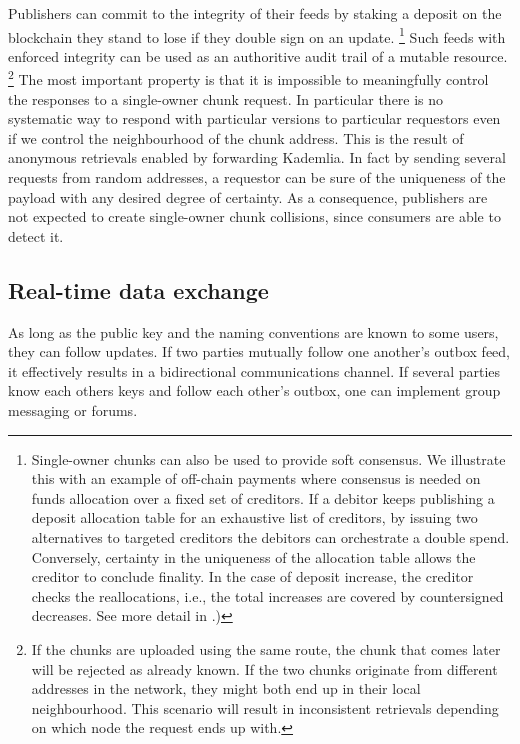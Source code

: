 Publishers can commit to the integrity of their feeds by staking a deposit on the blockchain they stand to lose if they double sign on an update.%
%
\footnote{Single-owner chunks can also be used to provide soft consensus. We illustrate this with an example of off-chain payments where  consensus  is needed on funds allocation over a fixed set of creditors. If a debitor keeps publishing a deposit allocation table for an exhaustive list of creditors, by issuing two alternatives to targeted creditors the debitors can orchestrate a double spend. Conversely, certainty in the uniqueness of the allocation table allows the creditor to conclude finality. In the case of deposit increase, the creditor checks the reallocations, i.e., the total increases are covered by countersigned decreases. See more  detail in \cite{tronetal-sw3games}.)}
%
Such feeds with enforced integrity can be used as an authoritive audit trail of a mutable resource.%
%
\footnote{If the chunks are uploaded using the same route, the chunk that comes later will be rejected as already known. If the two chunks originate from different addresses in the network, they might both end up in their local neighbourhood. This scenario will result in inconsistent retrievals depending on which node the request ends up with.}
%
The most important property is that it is impossible to meaningfully control the responses to a single-owner chunk request. In particular there is no systematic way to respond with particular versions to particular requestors even if we control the neighbourhood of the chunk  address. This is the result of anonymous retrievals enabled by forwarding Kademlia. In fact by sending several requests from random addresses, a requestor can be sure of the uniqueness of the payload with any desired degree of certainty. 
As a consequence, publishers are not expected to create single-owner chunk collisions, since consumers are able to detect it.  



\subsection{Real-time data exchange}\label{sec:real-time-data-exchange}

As long as the public key and the naming conventions are known to some users, they can follow updates. If two parties mutually follow one another's outbox feed, it effectively results in a bidirectional communications channel. If several parties know each others keys and follow each other's outbox, one can implement group messaging or forums. 

